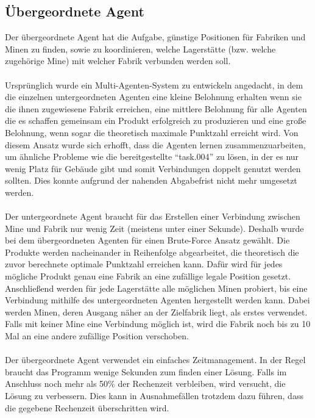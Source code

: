 \subsection{Übergeordnete Agent}
Der übergeordnete Agent hat die Aufgabe, günstige Positionen für Fabriken und Minen zu finden, sowie zu koordinieren, welche Lagerstätte (bzw. welche zugehörige Mine) mit welcher Fabrik verbunden werden soll. 
\\\\
Ursprünglich wurde  ein Multi-Agenten-System zu entwickeln angedacht, in dem die einzelnen untergeordneten Agenten eine kleine Belohnung erhalten wenn sie die ihnen zugewiesene Fabrik erreichen, eine mittlere Belohnung für alle Agenten die es schaffen gemeinsam ein Produkt erfolgreich zu produzieren und eine große Belohnung, wenn sogar die theoretisch maximale Punktzahl erreicht wird. Von diesem Ansatz wurde sich erhofft, dass die Agenten lernen zusammenzuarbeiten, um ähnliche Probleme wie die bereitgestellte “task.004” zu lösen, in der es nur wenig Platz für Gebäude gibt und somit Verbindungen doppelt genutzt werden sollten. Dies konnte aufgrund der nahenden Abgabefrist nicht mehr umgesetzt werden.
\\\\
Der untergeordnete Agent braucht für das Erstellen einer Verbindung zwischen Mine und Fabrik nur wenig Zeit (meistens unter einer Sekunde). Deshalb wurde  bei dem übergeordneten Agenten für einen Brute-Force Ansatz gewählt. Die Produkte werden nacheinander in Reihenfolge abgearbeitet, die theoretisch die zuvor berechnete optimale Punktzahl erreichen kann. Dafür wird für jedes mögliche Produkt genau eine Fabrik an eine zufällige legale Position gesetzt. Anschließend werden für jede Lagerstätte alle möglichen Minen probiert, bis eine Verbindung mithilfe des untergeordneten Agenten hergestellt werden kann. Dabei werden Minen, deren Ausgang näher an der Zielfabrik liegt, als erstes verwendet. Falls mit keiner Mine eine Verbindung möglich ist, wird die Fabrik noch bis zu 10 Mal an eine andere zufällige Position verschoben. 
\\\\
Der übergeordnete Agent verwendet ein einfaches Zeitmanagement. In der Regel braucht das Programm wenige Sekunden zum finden einer Lösung. Falls im Anschluss noch mehr als 50\% der Rechenzeit verbleiben, wird versucht, die Lösung zu verbessern. Dies kann in Ausnahmefällen trotzdem dazu führen, dass die gegebene Rechenzeit überschritten wird. 
\\\\
